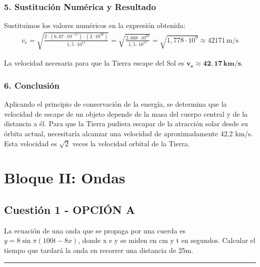 \subsubsection*{5. Sustitución Numérica y Resultado}
Sustituimos los valores numéricos en la expresión obtenida:
\begin{gather}
    v_e = \sqrt{\frac{2 \cdot (6,67 \cdot 10^{-11}) \cdot (2 \cdot 10^{30})}{1,5 \cdot 10^{11}}} = \sqrt{\frac{2,668 \cdot 10^{20}}{1,5 \cdot 10^{11}}} = \sqrt{1,778 \cdot 10^9} \approx 42171 \, \text{m/s}
\end{gather}
\begin{cajaresultado}
    La velocidad necesaria para que la Tierra escape del Sol es $\boldsymbol{v_e \approx 42,17 \, \textbf{km/s}}$.
\end{cajaresultado}

\subsubsection*{6. Conclusión}
\begin{cajaconclusion}
Aplicando el principio de conservación de la energía, se determina que la velocidad de escape de un objeto depende de la masa del cuerpo central y de la distancia a él. Para que la Tierra pudiera escapar de la atracción solar desde su órbita actual, necesitaría alcanzar una velocidad de aproximadamente 42,2 km/s. Esta velocidad es $\sqrt{2}$ veces la velocidad orbital de la Tierra.
\end{cajaconclusion}

\newpage

\section{Bloque II: Ondas}
\label{sec:ondas_2001_jun_ord}

\subsection{Cuestión 1 - OPCIÓN A}
\label{subsec:2A_2001_jun_ord}

\begin{cajaenunciado}
La ecuación de una onda que se propaga por una cuerda es $y=8\sin\pi(100t-8x)$, donde x e y se miden en cm y t en segundos. Calcular el tiempo que tardará la onda en recorrer una distancia de 25m.
\end{cajaenunciado}
\hrule

